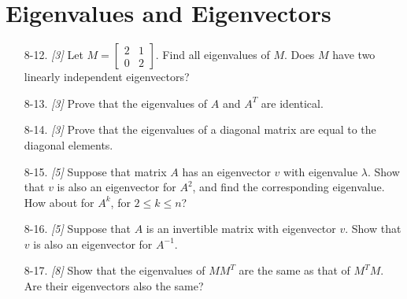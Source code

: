 \documentclass[10pt]{article}
\begin{document}
\section{Eigenvalues and Eigenvectors}
\begin{enumerate}
\item[8-12.] \textit{[3]} Let $M=\begin{bmatrix} 2 & 1 \\ 0 & 2 \end{bmatrix}$. Find all eigenvalues of $M$. Does $M$ have two linearly independent eigenvectors?

\item[8-13.] \textit{[3]} Prove that the eigenvalues of $A$ and $A^{T}$ are identical.

\item[8-14.] \textit{[3]} Prove that the eigenvalues of a diagonal matrix are equal to the diagonal elements.

\item[8-15.] \textit{[5]} Suppose that matrix $A$ has an eigenvector $v$ with eigenvalue $\lambda$. Show that $v$ is also an eigenvector for $A^{2}$, and find the corresponding eigenvalue. How about for $A^{k}$, for $2 \leq k \leq n$?

\item[8-16.] \textit{[5]} Suppose that $A$ is an invertible matrix with eigenvector $v$. Show that $v$ is also an eigenvector for $A^{-1}$.

\item[8-17.] \textit{[8]} Show that the eigenvalues of $MM^{T}$ are the same as that of $M^{T} M$. Are their eigenvectors also the same?

\end{enumerate}
\end{document}
